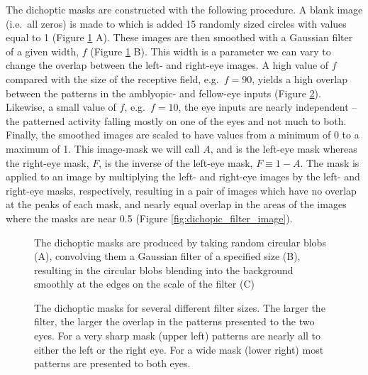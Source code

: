 \documentclass[
  onecolumn]{article}
\begin{document}
The dichoptic masks are constructed with the following procedure. A
blank image (i.e.~all zeros) is made to which is added 15 randomly sized
circles with values equal to 1 (Figure \ref{fig:dichopic_blob} A). These
images are then smoothed with a Gaussian filter of a given width, \(f\)
(Figure \ref{fig:dichopic_blob} B). This width is a parameter we can
vary to change the overlap between the left- and right-eye images. A
high value of \(f\) compared with the size of the receptive field,
e.g.~\(f=90\), yields a high overlap between the patterns in the
amblyopic- and fellow-eye inputs (Figure
\ref{fig:dichopic_filter_size}). Likewise, a small value of \(f\),
e.g.~\(f=10\), the eye inputs are nearly independent -- the patterned
activity falling mostly on one of the eyes and not much to both.
Finally, the smoothed images are scaled to have values from a minimum of
0 to a maximum of 1. This image-mask we will call \(A\), and is the
left-eye mask whereas the right-eye mask, \(F\), is the inverse of the
left-eye mask, \(F\equiv 1-A\). The mask is applied to an image by
multiplying the left- and right-eye images by the left- and right-eye
masks, respectively, resulting in a pair of images which have no overlap
at the peaks of each mask, and nearly equal overlap in the areas of the
images where the masks are near 0.5 (Figure
\ref{fig:dichopic_filter_image}).

\begin{figure}
\hypertarget{fig:dichopic_blob}{%
\centering

\caption{The dichoptic masks are produced by taking random circular
blobs (A), convolving them a Gaussian filter of a specified size (B),
resulting in the circular blobs blending into the background smoothly at
the edges on the scale of the filter (C)}\label{fig:dichopic_blob}
}
\end{figure}

\begin{figure}
\hypertarget{fig:dichopic_filter_size}{%
\centering

\caption{The dichoptic masks for several different filter sizes. The
larger the filter, the larger the overlap in the patterns presented to
the two eyes. For a very sharp mask (upper left) patterns are nearly all
to either the left or the right eye. For a wide mask (lower right) most
patterns are presented to both eyes.}\label{fig:dichopic_filter_size}
}
\end{figure}
\end{document}
